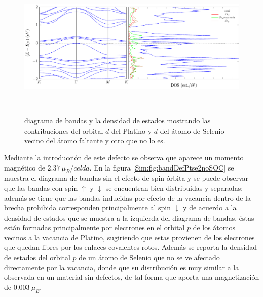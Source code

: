 \begin{figure}
	\centering
	\includegraphics[width=12cm, height=7cm]{figRes/PtSe2/def/bandas/comparacionbandas/bandasDOS.pdf}
	\caption[Diagrama de bandas y densidad de estados del PtSe\textsubscript{2} con vacancia de Platino y efecto spin-\'orbita.]{diagrama de bandas y la densidad de estados mostrando las contribuciones del orbital $d$ del Platino y $d$ del \'atomo de Selenio vecino del \'atomo faltante y otro que no lo es.}
	\label{Sim:fig:bandasSOCPtSe2vac}
\end{figure}

Mediante la introducci\'on de este defecto se observa que aparece un momento magn\'etico de $2.37~ \mu_{B}/celda$. En la figura \ref{Sim:fig:bandDefPtse2noSOC} se muestra el diagrama de bandas sin el efecto de spin-\'orbita y se puede observar que  las bandas con spin $\uparrow$ y $\downarrow$ se encuentran bien distribuidas y separadas;  adem\'as se tiene que las  bandas inducidas por efecto de la vacancia  dentro de la brecha prohibida   corresponden principalmente al  spin $\downarrow$  y de acuerdo  a la densidad de estados que se muestra a la izquierda del diagrama de bandas, \'estas est\'an formadas principalmente por electrones en el orbital $p$ de los \'atomos vecinos a la vacancia de Platino, sugiriendo   que estas  provienen de los electrones que quedan libres por los enlaces covalentes rotos. Adem\'as  se reporta la densidad de estados del orbital $p$ de un \'atomo de Selenio que no se ve afectado directamente por la vacancia,  donde que su distribuci\'on es muy similar a la observada en un material sin defectos, de tal forma que aporta una magnetizaci\'on de $0.003 ~\mu_{B}$.

